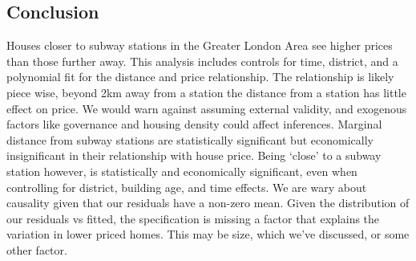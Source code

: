 \subsection{Conclusion}
Houses closer to subway stations in the Greater London Area see higher prices than those further away. 
This analysis includes controls for time, district, and a polynomial fit for the distance and price relationship.
The relationship is likely piece wise, beyond 2km away from a station the distance from a station has little effect on price.
We would warn against assuming external validity, and exogenous factors like governance and housing density could affect inferences. 
Marginal distance from subway stations are statistically significant but economically insignificant in their relationship with house price.
Being `close' to a subway station however, is statistically and economically significant, even when controlling for district, building age,
 and time effects. We are wary about causality given that our residuals have a non-zero mean. Given the 
 distribution of our residuals vs fitted, the specification is missing a factor that explains the variation in lower priced homes. This may be size, which we've discussed,
 or some other factor.